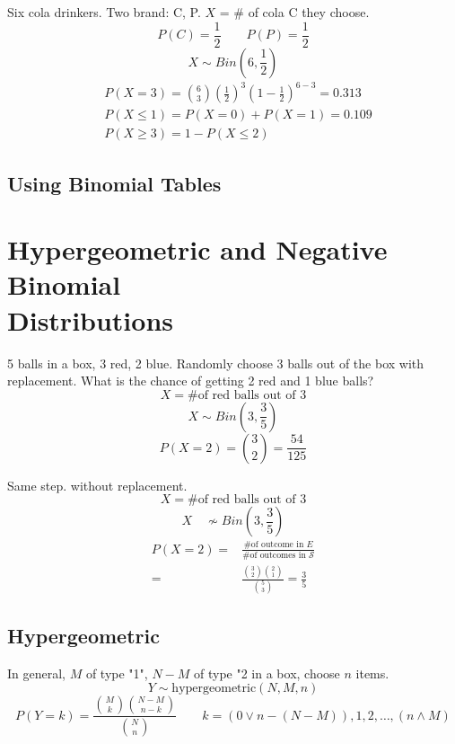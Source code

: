 \begin{exmp}
Six cola drinkers. Two brand: C, P. $X$ = \# of cola C they choose.
\[P(C)=\frac{1}{2} \qquad P(P)=\frac{1}{2}\]
\[X \sim Bin \left(6,\frac{1}{2} \right)\]
\begin{align*}
&P(X=3)=\binom 63 \left(\frac{1}{2}\right)^3	\left(1-\frac{1}{2}\right)^{6-3}=0.313 \\
&P(X \leq 1)=P(X=0)+P(X=1)=0.109 \\
&P(X \geq 3)=1-P(X \leq 2)
\end{align*}
\end{exmp}

\subsection{Using Binomial Tables}

\section{Hypergeometric and Negative Binomial\\ Distributions}
\begin{exmp}
5 balls in a box, 3 red, 2 blue. Randomly choose 3 balls out of the box with replacement. What is the chance of getting 2 red and 1 blue balls?
\[X= \text{\# of red balls out of 3}\]
\[X \sim  Bin\left(3,\frac{3}{5}\right)\]
\[P(X=2)=\binom 32 =\frac{54}{125}\]
\end{exmp}

\begin{exmp}
Same step. without replacement.
\[X= \text{\# of red balls out of 3}\]
\[X \quad  \not\sim  Bin\left(3,\frac{3}{5}\right)\]
\begin{align*}
P(X=2)=& \frac{\text{\# of outcome in } E}{\text{\# of outcomes in } \mathcal{S}} \\
=& \frac{\binom 32 \binom 21}{\binom 53} =\frac{3}{5}
\end{align*}
\end{exmp}

\subsection{Hypergeometric}
\begin{prop}
In general, $M$ of type "1", $N-M$ of type "2 in a box, choose $n$ items.
\[Y \sim \text{hypergeometric}(N,M,n)\]
\[P(Y=k)=\frac{\binom Mk \binom {N-M}{n-k}}{\binom N n}\qquad k=(0 \vee n-(N-M)),1,2,\dots,(n \wedge M)\]
\end{prop}

